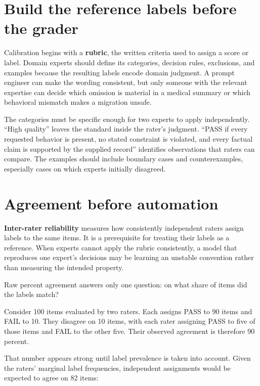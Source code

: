 \hypertarget{build-the-reference-labels-before-the-grader}{%
\section{Build the reference labels before the grader}\label{build-the-reference-labels-before-the-grader}}

Calibration begins with a \textbf{rubric}, the written criteria used to assign a score or label. Domain experts should define its categories, decision rules, exclusions, and examples because the resulting labels encode domain judgment. A prompt engineer can make the wording consistent, but only someone with the relevant expertise can decide which omission is material in a medical summary or which behavioral mismatch makes a migration unsafe.

The categories must be specific enough for two experts to apply independently. ``High quality'' leaves the standard inside the rater's judgment. ``PASS if every requested behavior is present, no stated constraint is violated, and every factual claim is supported by the supplied record'' identifies observations that raters can compare. The examples should include boundary cases and counterexamples, especially cases on which experts initially disagreed.

\hypertarget{agreement-before-automation}{%
\section{Agreement before automation}\label{agreement-before-automation}}

\textbf{Inter-rater reliability} measures how consistently independent raters assign labels to the same items. It is a prerequisite for treating their labels as a reference. When experts cannot apply the rubric consistently, a model that reproduces one expert's decisions may be learning an unstable convention rather than measuring the intended property.

Raw percent agreement answers only one question: on what share of items did the labels match?

Consider 100 items evaluated by two raters. Each assigns PASS to 90 items and FAIL to 10. They disagree on 10 items, with each rater assigning PASS to five of those items and FAIL to the other five. Their observed agreement is therefore 90 percent.

That number appears strong until label prevalence is taken into account. Given the raters' marginal label frequencies, independent assignments would be expected to agree on 82 items:


